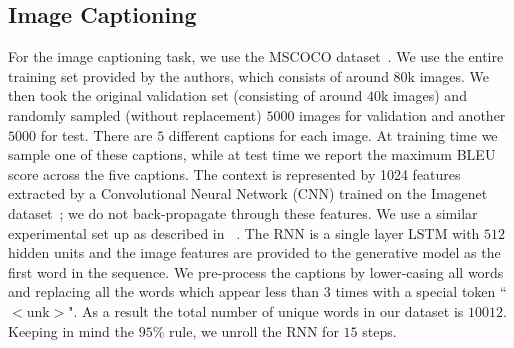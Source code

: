 \documentclass{article} \usepackage{iclr2016_conference,times}
\begin{document}
\subsection{Image Captioning}
For the image captioning task, we use the MSCOCO
dataset~\citep{mscoco}. We use the entire training set provided by the authors, which consists of around $80$k images. We then took the original validation set (consisting of around $40$k images) and randomly sampled (without replacement) $5000$ images for validation and another $5000$ for test. 
There are $5$ different captions for each image. 
At training time we sample one of
these captions, while at test time we report the maximum BLEU score across the five captions.
The context is represented by 1024 features extracted by a Convolutional Neural Network (CNN) trained
on the Imagenet dataset~\citep{imagenet_cvpr09}; we do not back-propagate through these features. We use a similar experimental set up as described in ~\citet{sbengio-nips2015}. The RNN is a single layer LSTM with 
$512$ hidden units and the image features are provided to the generative model as the first word in the sequence. We pre-process the captions by lower-casing all words and replacing all the words which appear less than 3 times with a special token ``$<$unk$>$". As a result the total number of unique words in our dataset is $10012$. Keeping in mind the $95\%$ rule, we unroll the RNN for $15$ steps.
\end{document}
